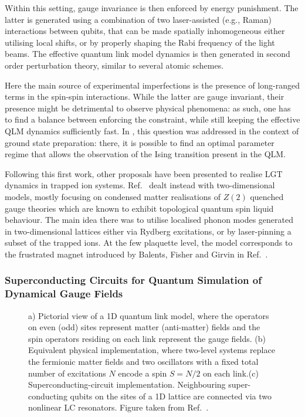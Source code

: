 \documentclass[epj,final]{svjour}
\begin{document}
Within this setting, gauge invariance is then enforced by energy punishment. The latter is generated using a combination of two laser-assisted (e.g., Raman) interactions between qubits, that can be made spatially inhomogeneous either utilising local shifts, or by properly shaping the Rabi frequency of the light beams. The effective quantum link model dynamics is then generated in second order perturbation theory, similar to several atomic schemes. 

Here the main source of experimental imperfections is the presence of long-ranged terms in the spin-spin interactions. While the latter are gauge invariant, their presence might be detrimental to observe physical phenomena: as such, one has to find a balance between enforcing the constraint, while still keeping the effective QLM dynamics sufficiently fast. In \cite{hauke2013quantum}, this question was addressed in the context of ground state preparation: there, it is possible to find an optimal parameter regime that allows the observation of the Ising transition present in the QLM. 

Following this first work, other proposals have been presented to realise LGT dynamics in trapped ion systems. Ref.~\cite{Nath:2015to} dealt instead with two-dimensional models, mostly focusing on condensed matter realisations of $Z(2)$ quenched gauge theories which are known to exhibit topological quantum spin liquid behaviour. The main idea there was to utilise localised phonon modes generated in two-dimensional lattices either via Rydberg excitations, or by laser-pinning a subset of the trapped ions. At the few plaquette level, the model corresponds to the frustrated magnet introduced by Balents, Fisher and Girvin in Ref.~\cite{Balents:2002yi}.

\subsubsection{Superconducting Circuits for Quantum Simulation of Dynamical Gauge Fields\cite{marcos2013superconducting}}

\begin{figure}
\caption{a) Pictorial view of a 1D quantum link model, where the operators on even (odd) sites represent matter (anti-matter) fields and the spin operators residing on each link represent the gauge fields. (b) Equivalent physical implementation, where two-level systems replace the fermionic matter fields and two oscillators with a fixed total number of excitations $N$ encode a spin $S=N/2$ on each link.(c) Superconducting-circuit implementation. Neighbouring super-conducting qubits on the sites of a 1D lattice are connected via two nonlinear LC resonators. Figure taken from Ref.~\cite{marcos2013superconducting}.}
\end{figure} 
\end{document}
